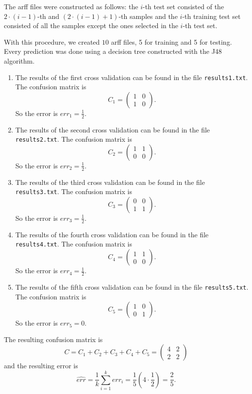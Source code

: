 \documentclass[fontsize=12pt, usenames, dvipsnames, headinclude, headsepline, footinclude, footsepline]{scrartcl}
\begin{document}
  \begin{sol}
    The arff files were constructed as follows: the $i$-th test set consisted of the $2\cdot(i-1)$-th and $(2
    \cdot (i-1) + 1)$-th samples and the $i$-th training test set consisted of all the samples except the ones
    selected in the $i$-th test set.

    With this procedure, we created $10$ arff files, 5 for training and 5 for testing. Every prediction was
    done using a decision tree constructed with the J48 algorithm.
    \begin{enumerate}
    \item The results of the first cross validation can be found in the file \texttt{results1.txt}. The
      confusion matrix is 
      \[ C_1 = \begin{pmatrix} 1 & 0 \\ 1 & 0 \end{pmatrix}. \]
      So the error is $err_1 = \frac{1}{2}$.
    \item The results of the second cross validation can be found in the file \texttt{results2.txt}. The
      confusion matrix is 
      \[ C_2 = \begin{pmatrix} 1 & 1 \\ 0 & 0 \end{pmatrix}. \]
      So the error is $err_2 = \frac{1}{2}$.
    \item The results of the third cross validation can be found in the file \texttt{results3.txt}. The
      confusion matrix is 
      \[ C_3 = \begin{pmatrix} 0 & 0 \\ 1 & 1 \end{pmatrix}. \]
      So the error is $err_3 = \frac{1}{2}$.
    \item The results of the fourth cross validation can be found in the file \texttt{results4.txt}. The
      confusion matrix is 
      \[ C_4 = \begin{pmatrix} 1 & 1 \\ 0 & 0 \end{pmatrix}. \]
      So the error is $err_4 = \frac{1}{2}$.
    \item The results of the fifth cross validation can be found in the file \texttt{results5.txt}. The
      confusion matrix is 
      \[ C_5 = \begin{pmatrix} 1 & 0 \\ 0 & 1 \end{pmatrix}. \]
      So the error is $err_5 = 0$.
    \end{enumerate}
    The resulting confusion matrix is 
    \[ C = C_1 + C_2 + C_3 + C_4 + C_5 = \begin{pmatrix} 4 & 2 \\
      2 & 2 \end{pmatrix}\]
    and the resulting error is 
    \[ \widehat{err} = \frac{1}{k} \sum_{i = 1}^{k} err_i = \frac{1}{5} \left(4 \cdot  \frac{1}{2}\right) =
      \frac{2}{5}. \]


\end{sol}
\end{document}
